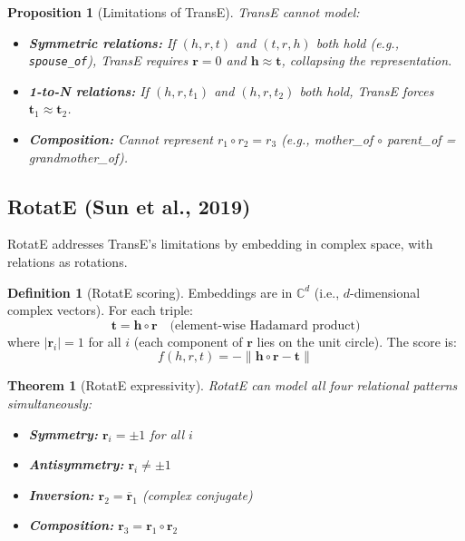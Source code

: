 \documentclass[11pt,a4paper,oneside,openany]{book}
\theoremstyle{definition}
\newtheorem{definition}{Definition}[chapter]
\theoremstyle{plain}
\newtheorem{theorem}{Theorem}[chapter]
\newtheorem{proposition}{Proposition}[chapter]
\theoremstyle{remark}
\newcommand{\C}{\mathbb{C}}
\begin{document}
\begin{proposition}[Limitations of TransE]
	TransE cannot model:
	\begin{itemize}
		\item \textbf{Symmetric relations:} If $(h, r, t)$ and $(t, r, h)$ both hold (e.g., \texttt{spouse\_of}), TransE requires $\mathbf{r} = 0$ and $\mathbf{h} \approx \mathbf{t}$, collapsing the representation.
		\item \textbf{1-to-N relations:} If $(h, r, t_1)$ and $(h, r, t_2)$ both hold, TransE forces $\mathbf{t}_1 \approx \mathbf{t}_2$.
		\item \textbf{Composition:} Cannot represent $r_1 \circ r_2 = r_3$ (e.g., mother\_of $\circ$ parent\_of = grandmother\_of).
	\end{itemize}
\end{proposition}

\subsection{RotatE (Sun et al., 2019)}

RotatE addresses TransE's limitations by embedding in complex space, with relations as rotations.

\begin{definition}[RotatE scoring]
	Embeddings are in $\C^d$ (i.e., $d$-dimensional complex vectors). For each triple:
	$$\mathbf{t} = \mathbf{h} \circ \mathbf{r} \quad \text{(element-wise Hadamard product)}$$
	where $|\mathbf{r}_i| = 1$ for all $i$ (each component of $\mathbf{r}$ lies on the unit circle). The score is:
	$$f(h, r, t) = -\|\mathbf{h} \circ \mathbf{r} - \mathbf{t}\|$$
\end{definition}

\begin{theorem}[RotatE expressivity]
	\label{thm:rotate}
	RotatE can model all four relational patterns simultaneously:
	\begin{itemize}
		\item \textbf{Symmetry:} $\mathbf{r}_i = \pm 1$ for all $i$
		\item \textbf{Antisymmetry:} $\mathbf{r}_i \neq \pm 1$
		\item \textbf{Inversion:} $\mathbf{r}_2 = \overline{\mathbf{r}}_1$ (complex conjugate)
		\item \textbf{Composition:} $\mathbf{r}_3 = \mathbf{r}_1 \circ \mathbf{r}_2$
	\end{itemize}
\end{theorem}
\end{document}

